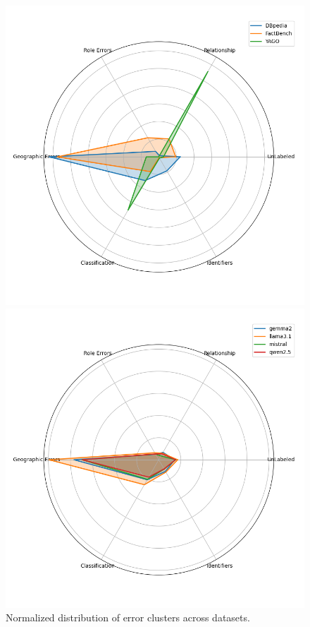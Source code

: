 \begin{figure}[ht!]
    \centering
    \begin{minipage}[b]{0.42\textwidth}
        \centering
        \includegraphics[width=\textwidth]{res/radarChart-normalized}
        \caption{Normalized distribution of error clusters across datasets.}
        \label{fig:normalized_distribution_of_error_clusters}
    \end{minipage}
    \hspace{0.05\textwidth} %
    \begin{minipage}[b]{0.42\textwidth}
        \centering
        \includegraphics[width=\textwidth]{res/radarChart-normalized-llms}

\end{minipage}
\end{figure}
